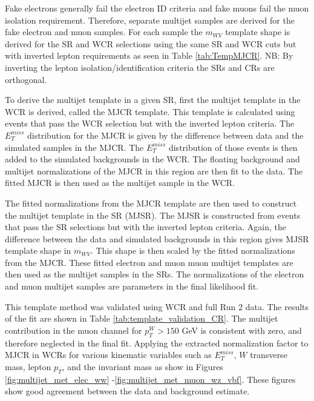 Fake electrons generally fail the electron ID criteria and fake muons fail the muon isolation requirement. Therefore, separate multijet samples are derived for the fake electron and muon samples. For each sample the $m_{WV}$ template shape is derived for the SR and WCR selections using the same SR and WCR cuts but with inverted lepton requirements as seen in Table \ref{tab:TempMJCR}. NB: By inverting the lepton isolation/identification criteria the SRs and CRs are orthogonal.

To derive the multijet template in a given SR, first the multijet template in the WCR is derived, called the MJCR template. This template is calculated using events that pass the WCR selection but with the inverted lepton criteria. The $E_{T}^{miss}$ distribution for the MJCR is given by the difference between data and the simulated samples in the MJCR. The $E_{T}^{miss}$ distribution of those events is then added to the simulated backgrounds in the WCR. The floating background and multijet normalizations of the MJCR in this region are then fit to the data. The fitted MJCR is then used as the multijet sample in the WCR. 

The fitted normalizations from the MJCR template are then used to construct the multijet template in the SR (MJSR). The MJSR is constructed from events that pass the SR selections but with the inverted lepton criteria. Again, the difference between the data and simulated backgrounds in this region gives MJSR template shape in $m_{WV}$. This shape is then scaled by the fitted normalizations from the MJCR. These fitted electron and muon muon multijet templates are then used as the multijet samples in the SRs. The normalizations of the electron and muon multijet samples are parameters in the final likelihood fit. 

This template method was validated using WCR and full Run 2 data. The results of the fit are shown in Table \ref{tab:template_validation_CR}. The multijet contribution in the muon channel for $p_{T}^{W} > 150$ GeV is consistent with zero, and therefore neglected in the final fit. Applying the extracted normalization factor to MJCR in WCRs for various kinematic variables such as $E_{T}^{miss}$, $W$ transverse mass, lepton $p_{T}$, and the invariant mass as show in Figures \ref{fig:multijet_met_elec_ww} -\ref{fig:multijet_met_muon_wz_vbf}. These figures show good agreement between the data and background estimate.


